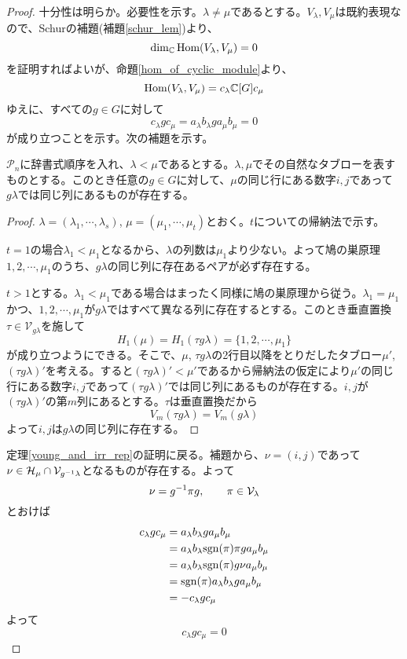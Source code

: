 \documentclass{ltjsarticle}
\begin{document}
\begin{proof}
  十分性は明らか。必要性を示す。$\lambda\neq\mu$であるとする。$V_\lambda, V_\mu$は既約表現なので、Schurの補題(補題\ref{schur_lem})より、
  \[
  \dim_{\mathbb{C}}\text{Hom}(V_\lambda,V_\mu)=0  
  \]
  を証明すればよいが、命題\ref{hom_of_cyclic_module}より、
  \[
  \text{Hom}(V_\lambda,V_\mu)=c_\lambda\mathbb{C}[G]c_\mu
  \]
  ゆえに、すべての$g\in G$に対して
  \[
  c_\lambda gc_\mu  =a_\lambda b_\lambda g a_\mu b_\mu = 0
  \]
  が成り立つことを示す。次の補題を示す。
  \begin{lemm}
    $\mathcal{P}_n$に辞書式順序を入れ、$\lambda < \mu$であるとする。$\lambda, \mu$でその自然なタブローを表すものとする。このとき任意の$g\in G$に対して、$\mu$の同じ行にある数字$i,j$であって$g\lambda$では同じ列にあるものが存在する。
  \end{lemm}

  \begin{proof}
    $\lambda=(\lambda_1,\cdots,\lambda_s)$, $\mu=(\mu_1,\cdots,\mu_t)$とおく。$t$についての帰納法で示す。

    $t=1$の場合$\lambda_1<\mu_1$となるから、$\lambda$の列数は$\mu_1$より少ない。よって鳩の巣原理$1,2,\cdots,\mu_1$のうち、$g\lambda$の同じ列に存在あるペアが必ず存在する。

    $t>1$とする。$\lambda_1<\mu_1$である場合はまったく同様に鳩の巣原理から従う。$\lambda_1=\mu_1$かつ、$1,2,\cdots,\mu_1$が$g\lambda$ではすべて異なる列に存在するとする。このとき垂直置換$\tau\in\mathcal{V}_{g\lambda}$を施して
    \[
    H_1(\mu)=H_1(\tau g\lambda)=\{1,2,\cdots,\mu_1\}  
    \]
    が成り立つようにできる。そこで、$\mu$, $\tau g\lambda$の2行目以降をとりだしたタブロー$\mu'$, $(\tau g\lambda)'$を考える。すると$(\tau g\lambda)'<\mu'$であるから帰納法の仮定により$\mu'$の同じ行にある数字$i,j$であって$(\tau g\lambda)'$では同じ列にあるものが存在する。$i,j$が$(\tau g\lambda)'$の第$m$列にあるとする。$\tau$は垂直置換だから
    \[
    V_m(\tau g\lambda)=V_m(g\lambda)
    \]
    よって$i,j$は$g\lambda$の同じ列に存在する。
  \end{proof}

  定理\ref{young_and_irr_rep}の証明に戻る。補題から、$\nu=(i,j)$であって$\nu\in \mathcal{H}_\mu\cap\mathcal{V}_{g^{-1}\lambda}$となるものが存在する。よって
  \[
  \nu=g^{-1}\pi g,\qquad \pi\in \mathcal{V}_{\lambda}
  \]
  とおけば
  \begin{align*}
    c_\lambda g c_\mu
    &=a_\lambda b_\lambda g a_\mu b_\mu\\
    &=a_\lambda b_\lambda \mathrm{sgn}(\pi)\pi g a_\mu b_\mu\\
    &=a_\lambda b_\lambda \mathrm{sgn}(\pi)g\nu a_\mu b_\mu\\
    &=\mathrm{sgn}(\pi)a_\lambda b_\lambda g a_\mu b_\mu\\
    &=-c_\lambda g c_\mu
  \end{align*}
  よって
  \[
    c_\lambda g c_\mu=0
  \]
\end{proof}
\end{document}
